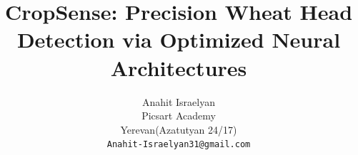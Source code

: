 \documentclass[10pt,twocolumn,letterpaper]{article}
\title{CropSense: Precision Wheat Head Detection via Optimized Neural Architectures}
\author{Anahit Israelyan\\
Picsart Academy\\
Yerevan(Azatutyan 24/17)\\
{\tt\small Anahit-Israelyan31@gmail.com}
}
\begin{document}
\maketitle
    



 



{
    \small
    
    
} 
\end{document}
